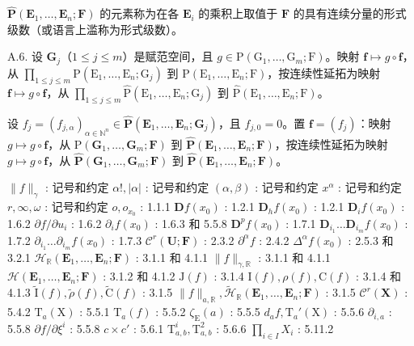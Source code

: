 \(\hat{\mathbf{P}}(\mathbf{E}_{1},\ldots,\mathbf{E}_{n};\mathbf{F})\) 的元素称为在各 \(\mathbf{E}_{i}\) 的乘积上取值于 \(\mathbf{F}\) 的具有连续分量的形式级数（或语言上滥称为形式级数）。

A.6. 设 \(\mathbf{G}_j\)（\(1 \leqslant j \leqslant m\)）是赋范空间，且 \(g \in \mathrm{P}(\mathrm{G}_1, \ldots, \mathrm{G}_m; \mathrm{F})\)。映射 \(\mathbf{f} \mapsto g \circ \mathbf{f}\)，从 \(\prod_{1 \leqslant j \leqslant m} \mathrm{P}(\mathrm{E}_1, \ldots, \mathrm{E}_n; \mathrm{G}_j)\) 到 \(\mathrm{P}(\mathrm{E}_1, \ldots, \mathrm{E}_n; \mathrm{F})\)，按连续性延拓为映射 \(\mathbf{f} \mapsto g \circ \mathbf{f}\)，从 \(\prod_{1 \leqslant j \leqslant m} \hat{\mathrm{P}}(\mathrm{E}_1, \ldots, \mathrm{E}_n; \mathrm{G}_j)\) 到 \(\hat{\mathrm{P}}(\mathrm{E}_1, \ldots, \mathrm{E}_n; \mathrm{F})\)。

设 \(f_j = (f_{j,\alpha})_{\alpha \in \mathbb{N}^n} \in \hat{\mathbf{P}}(\mathbf{E}_1, \ldots, \mathbf{E}_n; \mathbf{G}_j)\)，且 \(f_{j,0} = 0\)。置 \(\mathbf{f} = (f_j)\)：映射 \(g \mapsto g \circ \mathbf{f}\)，从 \(\mathrm{P}(\mathbf{G}_1, \ldots, \mathbf{G}_m; \mathbf{F})\) 到 \(\hat{\mathbf{P}}(\mathbf{E}_1, \ldots, \mathbf{E}_n; \mathbf{F})\)，按连续性延拓为映射 \(g \mapsto g \circ \mathbf{f}\)，从 \(\hat{\mathbf{P}}(\mathbf{G}_1, \ldots, \mathbf{G}_m; \mathbf{F})\) 到 \(\hat{\mathbf{P}}(\mathbf{E}_1, \ldots, \mathbf{E}_n; \mathbf{F})\)。


\(\| f \|_{\gamma}\) : 记号和约定 \(\alpha!, |\alpha|\) : 记号和约定 \((\alpha, \beta)\) : 记号和约定 \(x^{\alpha}\) : 记号和约定 \(r, \infty, \omega\) : 记号和约定 \(o, o_{x_0}\) : 1.1.1 \(\mathbf{D}f(x_0)\) : 1.2.1 \(\mathbf{D}_h f(x_0)\) : 1.2.1 \(\mathbf{D}_i f(x_0)\) : 1.6.2 \(\partial f / \partial u_i\) : 1.6.2 \(\partial_i f(x_0)\) : 1.6.3 和 5.5.8 \(\mathbf{D}^p f(x_0)\) : 1.7.1 \(\mathbf{D}_{i_1} \ldots \mathbf{D}_{i_m} f(x_0)\) : 1.7.2 \(\partial_{i_1} \ldots \partial_{i_m} f(x_0)\) : 1.7.3 \(\mathcal{C}^r (\mathbf{U};\mathbf{F})\) : 2.3.2 \(\partial^\alpha f\) : 2.4.2 \(\Delta^\alpha f(x_0)\) : 2.5.3 和 3.2.1 \(\mathcal{H}_{\mathbb{R}}(\mathbf{E}_1,\dots,\mathbf{E}_n;\mathbf{F})\) : 3.1.1 和 4.1.1 \(\| f \|_{\gamma,\mathbb{R}}\) : 3.1.1 和 4.1.1 \(\mathcal{H}(\mathbf{E}_1,\dots,\mathbf{E}_n;\mathbf{F})\) : 3.1.2 和 4.1.2 \(\mathrm{J}(f)\) : 3.1.4 \(\mathrm{I}(f), \rho(f), \mathrm{C}(f)\) : 3.1.4 和 4.1.3 \(\tilde{\mathrm{I}}(f), \tilde{\rho}(f), \tilde{\mathrm{C}}(f)\) : 3.1.5 \(\| f \|_{a,\mathbb{R}}, \tilde{\mathcal{H}}_{\mathbb{R}}(\mathbf{E}_1,\dots,\mathbf{E}_n;\mathbf{F})\) : 3.1.5 \(\mathcal{C}^r (\mathbf{X})\) : 5.4.2 \(\mathrm{T}_a(\mathrm{X})\) : 5.5.1 \(\mathrm{T}_a(f)\) : 5.5.2 \(\zeta_{\mathrm{E}}(a)\) : 5.5.5 \(d_a f, \mathrm{T}_a'(\mathrm{X})\) : 5.5.6 \(\partial_{i,a}\) : 5.5.8 \(\partial f / \partial\xi^i\) : 5.5.8 \(c \times c'\) : 5.6.1 \(\mathrm{T}_{a,b}^i, \mathrm{T}_{a,b}^2\) : 5.6.6 \(\prod_{i \in I} X_i\) : 5.11.2

